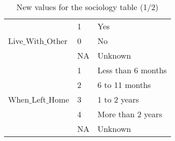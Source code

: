 \begin{table}[H]
\begin{tabular}{l | l | l}
            \multirow{3}{*}{Live$\_$With$\_$Other}
            						& \multicolumn{1}{l}{1}     & \multicolumn{1}{l}{Yes}     \\\cline{2-3}
                                    & \multicolumn{1}{l}{0}     & \multicolumn{1}{l}{No} \\\cline{2-3}
                                    & \multicolumn{1}{l}{NA}    & \multicolumn{1}{l}{Unknown}   \\\hline                                                                                                                                                                                                                        

            \multirow{5}{*}{When$\_$Left$\_$Home}
            						& \multicolumn{1}{l}{1}     & \multicolumn{1}{l}{Less than 6 months} \\\cline{2-3}
            						& \multicolumn{1}{l}{2}     & \multicolumn{1}{l}{6 to 11 months} \\\cline{2-3}
            						& \multicolumn{1}{l}{3}     & \multicolumn{1}{l}{1 to 2 years} \\\cline{2-3}
            						& \multicolumn{1}{l}{4}     & \multicolumn{1}{l}{More than 2 years} \\\cline{2-3}           
                                    & \multicolumn{1}{l}{NA}    & \multicolumn{1}{l}{Unknown}   \\\hline                                                                                                                                                                                                                        

        \end{tabular}

    \caption{New values for the sociology table (1/2)}

\end{table}

